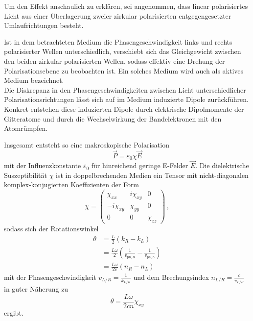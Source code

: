 Um den Effekt anschaulich zu erklären, sei angenommen, dass linear polarisiertes Licht aus einer Überlagerung zweier zirkular polarisierten
entgegengesetzter Umlaufrichtungen besteht.

Ist in dem betrachteten Medium die Phasengeschwindigkeit links und rechts polarisierter Wellen unterschiedlich, verschiebt sich das Gleichgewicht zwischen
den beiden zirkular polarisierten Wellen, sodass effektiv eine Drehung der Polarisationsebene zu beobachten ist.
Ein solches Medium wird auch als aktives Medium bezeichnet. \\

Die Diskrepanz in den Phasengeschwindigkeiten zwischen Licht unterschiedlicher Polarisationsrichtungen lässt sich auf im Medium induzierte Dipole zurückführen.
Konkret entstehen diese induzierten Dipole durch elektrische Dipolmomente der Gitteratome und durch die Wechselwirkung der Bandelektronen mit den Atomrümpfen.

Insgesamt entsteht so eine makroskopische Polarisation
\begin{equation}
    \vec{P} = \varepsilon_0 \chi \vec{E}
    \label{eq:polarisation} 
\end{equation}
mit der Influenzkonstante $\varepsilon_0$ für hinreichend geringe E-Felder $\vec{E}$.
Die dielektrische Suszeptibilität $\chi$ ist in doppelbrechenden Medien ein Tensor mit nicht-diagonalen komplex-konjugierten Koeffizienten der Form
\begin{equation*}
    \chi = \left( \begin{matrix}
        \chi_{xx}     & i\chi_{xy}    & 0 \\
        - i \chi_{xy} & \chi_{yy}     & 0 \\
        0             & 0             & \chi_{zz}
    \end{matrix}\right) \,,
\end{equation*}
sodass sich der Rotationswinkel 
\begin{align*}
    \theta &= \frac{L}{2} (k_R - k_L) \\
           &= \frac{L \omega}{2} \left(\frac{1}{v_{\text{ph},R}} - \frac{1}{v_{\text{ph},L}}\right) \\
           &= \frac{L \omega}{2 c} (n_R - n_L)
\end{align*}
mit der Phasengeschwindigkeit $v_{L/R} = \frac{1}{k_{L/R}}$ und dem Brechungsindex $n_{L/R} = \frac{c}{v_{L/R}}$ in guter Näherung zu
\begin{equation}
    \theta = \frac{L \omega}{2 c n} \chi_{xy}
    \label{eq:thetanoB}
\end{equation}
ergibt.

